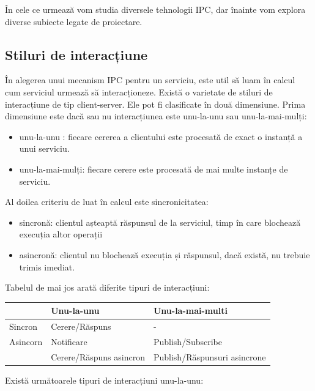 \documentclass[12pt, a4paper, oneside, romanian]{teza-upb}
\begin{document}
În cele ce urmează vom studia diversele tehnologii IPC, dar înainte vom explora diverse subiecte legate de proiectare. 


\subsection{Stiluri de interacțiune}

În alegerea unui mecanism IPC pentru un serviciu, este util să luam în calcul cum serviciul urmează să interacționeze. Există o varietate de stiluri de interacțiune de tip client-server.  Ele pot fi clasificate în două dimensiune. Prima dimensiune este dacă sau nu interacțiunea este unu-la-unu sau unu-la-mai-mulți: 

\begin{itemize}
 \item unu-la-unu : fiecare cererea a clientului este procesată de exact o instanță a unui serviciu.
 \item unu-la-mai-mulți: fiecare cerere este procesată de mai multe instanțe de serviciu.
\end{itemize}

Al doilea criteriu de luat în calcul este sincronicitatea:

\begin{itemize}
	\item sincronă: clientul așteaptă răspunsul de la serviciul, timp în care blochează execuția altor operații
	\item asincronă: clientul nu blochează execuția și răspunsul, dacă există, nu trebuie trimis imediat.
\end{itemize}
	
Tabelul de mai jos arată diferite tipuri de interacțiuni:
\begin{center}
\begin{tabular}{|l|l|l|}
\hline
& Unu-la-unu & Unu-la-mai-multi \\ \hline
Sincron & Cerere/Răspuns & - \\ \hline
Asincorn & Notificare & Publish/Subscribe \\ 
& Cerere/Răspuns asincron & Publish/Răspunsuri asincrone \\ \hline
\end{tabular}
\end{center}

Există următoarele tipuri de interacțiuni unu-la-unu:
\end{document}
